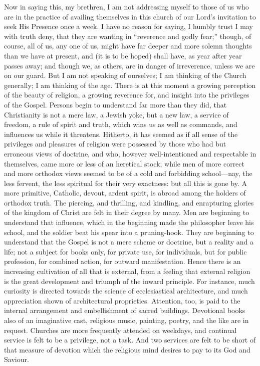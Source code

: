 Now in saying this, my brethren, I am not addressing myself to
those of us who are in the practice of availing themselves in this
church of our Lord's invitation to seek His Presence once a week. I
have no reason for saying, I humbly trust I may with truth deny, that
they are wanting in ``reverence and godly fear;'' though, of
course, all of us, any one of us, might have far deeper and more
solemn thoughts than we have at present, and (it is to be hoped) shall
have, as year after year passes away; and though we, as others, are in
danger of irreverence, unless we are on our guard. But I am not
speaking of ourselves; I am thinking of the Church generally; I am
thinking of the age. There is at this moment a growing perception of
the beauty of religion, a growing reverence for, and insight into the
privileges of the Gospel. Persons begin to understand far more than
they did, that Christianity is not a mere law, a Jewish yoke, but a
new law, a service of freedom, a rule of spirit and truth, which wins
us as well as commands, and influences us while it threatens.
Hitherto, it has seemed as if all sense of the privileges and
pleasures of religion were possessed by those who had but erroneous
views of doctrine, and who, however well-intentioned and respectable
in themselves, came more or less of an heretical stock; while men of
more correct and more orthodox views seemed to be of a cold and
forbidding school—nay, the less fervent, the less spiritual for
their very exactness: but all this is gone by. A more primitive,
Catholic, devout, ardent spirit, is abroad among the holders of
orthodox truth. The piercing, and thrilling, and kindling, and
enrapturing glories of the kingdom of Christ are felt in their degree
by many. Men are beginning to understand that influence, which in the
beginning made the philosopher leave his school, and the soldier beat
his spear into a pruning-hook. They are beginning to understand that
the Gospel is not a mere scheme or doctrine, but a reality and a life;
not a subject for books only, for private use, for individuals, but
for public profession, for combined action, for outward manifestation.
Hence there is an increasing cultivation of all that is external, from
a feeling that external religion is the great development and triumph
of the inward principle. For instance, much curiosity is directed
towards the science of ecclesiastical architecture, and much
appreciation shown of architectural proprieties. Attention, too, is
paid to the internal arrangement and embellishment of sacred
buildings. Devotional books also of an imaginative cast, religious
music, painting, poetry, and the like are in request. Churches are
more frequently attended on weekdays, and continual service is felt to
be a privilege, not a task. And two services are felt to be short of
that measure of devotion which the religious mind desires to pay to
its God and Saviour.

